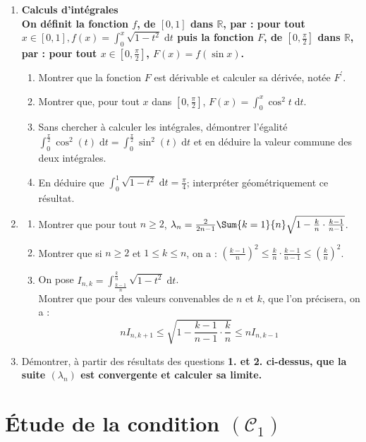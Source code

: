 \documentclass[landscape,twocolumn,leqno,a4paper,10pt]{report} %
\renewcommand{\geq}{\geqslant}
\renewcommand{\leq}{\leqslant}
\renewcommand{\textbf}[1]{\begingroup\bfseries\mathversion{bold}#1\endgroup}		%
\renewcommand{\d}{\;\mathrm{d}}	%
\newcommand{\Int}[4]{{\displaystyle\int_{#1}^{#2} #3  \d #4}}   					%
\begin{document}
\begin{enumerate}
	\item \textbf{Calculs d'intégrales}\\
	On définit la fonction $f$, de $[0,1]$ dans $\mathbb{R}$, par : pour tout $x \in[0,1], f(x)=\Int{0}{x}{\sqrt{1-t^{2}}}{t}$ puis la fonction $F$, de $\left[0, \frac{\pi}{2}\right]$ dans $\mathbb{R}$, par : pour tout $x \in\left[0, \frac{\pi}{2}\right]$, $F(x)=f(\sin x)$.
	\begin{enumerate}
		\item Montrer que la fonction $F$ est dérivable et calculer sa dérivée, notée $F^{\prime}$.
		\item Montrer que, pour tout $x$ dans $\left[0, \frac{\pi}{2}\right]$, $F(x)=\Int{0}{x}{\cos^2 t}{t}$.
		\item Sans chercher à calculer les intégrales, démontrer l'égalité $\Int{0}{\frac{\pi}{2}}{\cos ^{2}(t)}{t}=\Int{0}{\frac{\pi}{2}}{\sin ^{2}(t)}{t}$ et en déduire la valeur commune des deux intégrales.
		\item En déduire que $\Int{0}{1}{\sqrt{1-t^{2}}}{t}=\frac{\pi}{4}$; interpréter géométriquement ce résultat.
	\end{enumerate}
	\item \begin{enumerate}
		\item Montrer que pour tout $n \geq 2$, $\lambda_{n}=\frac{2}{2 n-1} \Sum{k=1}{n} \sqrt{1-\frac{k}{n} \cdot \frac{k-1}{n-1}}$.
		\item Montrer que si $n \geq 2$ et $1 \leq k \leq n$, on a : $\left(\frac{k-1}{n}\right)^{2} \leq \frac{k}{n} \cdot \frac{k-1}{n-1} \leq\left(\frac{k}{n}\right)^{2}$.
		\item On pose $I_{n, k}=\Int{\frac{k-1}{n}}{\frac{k}{n}}{\sqrt{1-t^{2}}}{t}$.\\
		Montrer que pour des valeurs convenables de $n$ et $k$, que l'on précisera, on a :
		$$n I_{n, k+1} \leq \sqrt{1-\frac{k-1}{n-1} \cdot \frac{k}{n}} \leq n I_{n, k-1}$$
	\end{enumerate}
	\item Démontrer, à partir des résultats des questions \textbf{1.} et \textbf{2.} ci-dessus, que la suite $\left(\lambda_{n}\right)$ est convergente et calculer sa limite.
\end{enumerate}

\newpage

\section{Étude de la condition $\left(\mathcal{C}_{1}\right)$}
\end{document}
